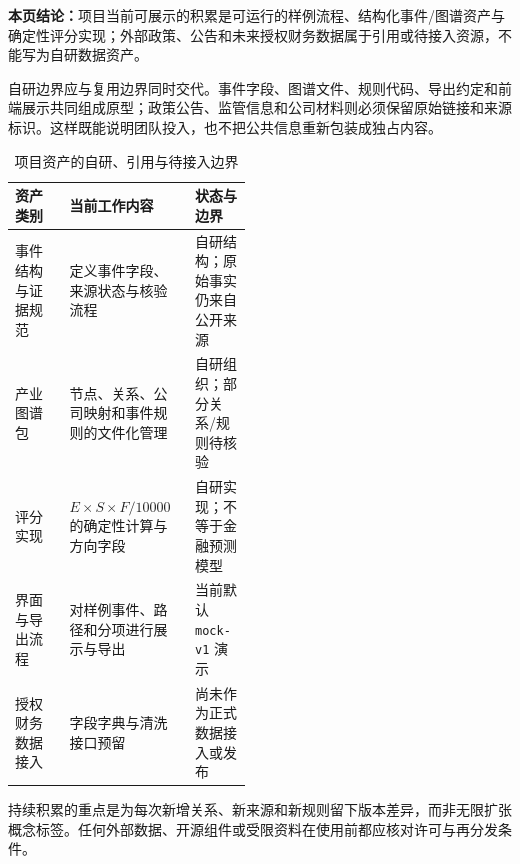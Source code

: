 \textbf{本页结论：}项目当前可展示的积累是可运行的样例流程、结构化事件/图谱资产与确定性评分实现；外部政策、公告和未来授权财务数据属于引用或待接入资源，不能写为自研数据资产。

自研边界应与复用边界同时交代。事件字段、图谱文件、规则代码、导出约定和前端展示共同组成原型；政策公告、监管信息和公司材料则必须保留原始链接和来源标识。这样既能说明团队投入，也不把公共信息重新包装成独占内容。

\begin{table}[htbp]
\centering
\caption{项目资产的自研、引用与待接入边界}
\label{tab:wty-own-work}
\small
\begin{tabularx}{\linewidth}{p{0.23\linewidth}X p{0.24\linewidth}}
\toprule
资产类别 & 当前工作内容 & 状态与边界 \\
\midrule
事件结构与证据规范 & 定义事件字段、来源状态与核验流程 & 自研结构；原始事实仍来自公开来源 \\
产业图谱包 & 节点、关系、公司映射和事件规则的文件化管理 & 自研组织；部分关系/规则待核验 \\
评分实现 & $E\times S\times F/10000$ 的确定性计算与方向字段 & 自研实现；不等于金融预测模型 \\
界面与导出流程 & 对样例事件、路径和分项进行展示与导出 & 当前默认 \texttt{mock-v1} 演示 \\
授权财务数据接入 & 字段字典与清洗接口预留 & 尚未作为正式数据接入或发布 \\
\bottomrule
\end{tabularx}
\end{table}

持续积累的重点是为每次新增关系、新来源和新规则留下版本差异，而非无限扩张概念标签。任何外部数据、开源组件或受限资料在使用前都应核对许可与再分发条件。

